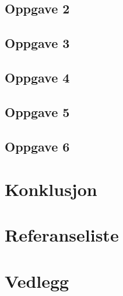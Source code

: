 \documentclass{article}
\begin{document}
\subsection{Oppgave 2} %
\label{sub:oppgave_2}

\newpage


\subsection{Oppgave 3} %
\label{sub:oppgave_3}

\newpage


\subsection{Oppgave 4} %
\label{sub:oppgave_4}

\newpage


\subsection{Oppgave 5} %
\label{sub:oppgave_5}

\newpage


\subsection{Oppgave 6} %
\label{sub:oppgave_6}

\newpage




\section{Konklusjon} %
\label{sec:konklusjon}

\newpage

\newpage
\section{Referanseliste}



\section{Vedlegg} %
\label{sec:vedlegg}

\end{document}
